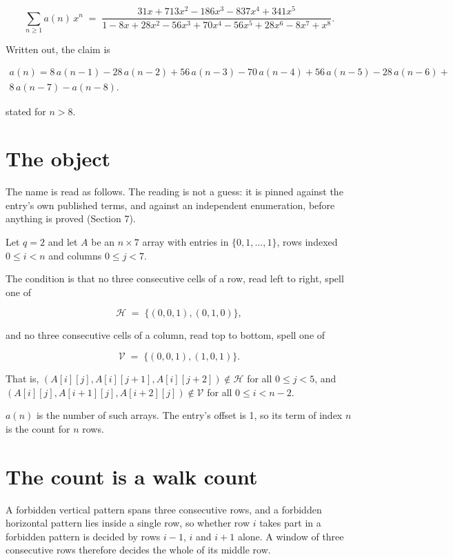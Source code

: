 \documentclass[11pt]{article}
\theoremstyle{definition}
\begin{document}
\[\sum_{n \ge 1} a(n)\,x^n \;=\; \frac{31x + 713x^{2} - 186x^{3} - 837x^{4} + 341x^{5}}{1 - 8x + 28x^{2} - 56x^{3} + 70x^{4} - 56x^{5} + 28x^{6} - 8x^{7} + x^{8}}.\]

Written out, the claim is

\begin{multline*} a(n) = 8\,a(n-1) - 28\,a(n-2) + 56\,a(n-3) - 70\,a(n-4) + 56\,a(n-5) - 28\,a(n-6) + \\ 8\,a(n-7) - a(n-8). \end{multline*}

stated for $n > 8$.

\section{The object}

The name is read as follows. The reading is not a guess: it is pinned against the entry's own published terms, and against an independent enumeration, before anything is proved (Section 7).

Let $q = 2$ and let $A$ be an $n \times 7$ array with entries in $\{0,1,\dots,1\}$, rows indexed $0 \le i < n$ and columns $0 \le j < 7$.

The condition is that no three consecutive cells of a row, read left to right, spell one of

\[\mathcal{H} \;=\; \{(0,0,1), (0,1,0)\},\]

and no three consecutive cells of a column, read top to bottom, spell one of

\[\mathcal{V} \;=\; \{(0,0,1), (1,0,1)\}.\]

That is, $(A[i][j],A[i][j{+}1],A[i][j{+}2]) \notin \mathcal{H}$ for all $0 \le j < 5$, and $(A[i][j],A[i{+}1][j],A[i{+}2][j]) \notin \mathcal{V}$ for all $0 \le i < n-2$.

$a(n)$ is the number of such arrays. The entry's offset is 1, so its term of index $n$ is the count for $n$ rows.

\section{The count is a walk count}

A forbidden vertical pattern spans three consecutive rows, and a forbidden horizontal pattern lies inside a single row, so whether row $i$ takes part in a forbidden pattern is decided by rows $i-1$, $i$ and $i+1$ alone. A window of three consecutive rows therefore decides the whole of its middle row.
\end{document}
